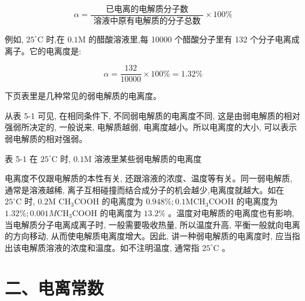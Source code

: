 \documentclass[10pt]{article}
\begin{document}
\[
\alpha = \frac{\text{ 已电离的电解质分子数 }}{\text{ 溶液中原有电解质的分子总数 }} \times {100}\%
\]

例如, \({25}^{ \circ }\mathrm{C}\) 时,在 \({0.1}\mathrm{M}\) 的醋酸溶液里,每 10000 个醋酸分子里有 132 个分子电离成离子。它的电离度是:

\[
\alpha = \frac{132}{10000} \times {100}\% = {1.32}\%
\]

下页表里是几种常见的弱电解质的电离度。

从表 5-1 可见, 在相同条件下, 不同弱电解质的电离度不同, 这是由弱电解质的相对强弱所决定的, 一般说来, 电解质越弱, 电离度越小。所以电离度的大小, 可以表示弱电解质的相对强弱。

表 5-1 在 \({25}^{ \circ }\mathrm{C}\) 时, \({0.1}\mathrm{M}\) 溶液里某些弱电解质的电离度

\begin{center}
\end{center}

电离度不仅跟电解质的本性有关, 还跟溶液的浓度、温度等有关。同一弱电解质, 通常是溶液越稀, 离子互相碰撞而结合成分子的机会越少,电离度就越大。如在 \({25}^{ \circ }\mathrm{C}\) 时, \({0.2}\mathrm{M}\) \({\mathrm{{CH}}}_{3}\mathrm{{COOH}}\) 的电离度为 \({0.948}\% ;{0.1}{\mathrm{{MCH}}}_{3}\mathrm{{COOH}}\) 的电离度为 \({1.32}\% ;{0.001M}{\mathrm{{CH}}}_{3}\mathrm{{COOH}}\) 的电离度为 \({13.2}\%\) 。温度对电解质的电离度也有影响, 当电解质分子电离成离子时, 一般需要吸收热量, 所以温度升高, 平衡一般就向电离的方向移动, 从而使电解质电离度增大。因此, 讲一种弱电解质的电离度时, 应当指出该电解质溶液的浓度和温度。如不注明温度, 通常指 \({25}^{ \circ }\mathrm{C}\) 。

\section*{二、电离常数}
\end{document}
